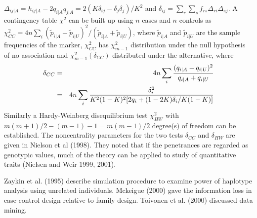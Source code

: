 $\Delta_{ij|A}=h_{ij|A}-2q_{i|A}q_{j|A}=2(K\delta_{ij}-\delta_j\delta_j)/K^2$
and $\delta_{ij}=\sum_r\sum_s f_{rs}\Delta_{ri}\Delta_{sj}$.  A contingency
table $\chi^2$ can be built up using $n$ cases and $n$ controls as
$\chi_{CC}^2=4n\sum_i(\tilde p_{i|A}-\tilde p_{i|U})^2/(\tilde p_{i|A}+\tilde
p_{i|U})$, where $\tilde p_{i|A}$ and $\tilde p_{i|U}$ are the sample
frequencies of the marker, $\chi_{CC}^2$ has $\chi^2_{m-1}$ distribution under
the null hypothesis of no association and $\chi^2_{m-1}(\delta_{CC})$
distributed under the alternative, where
\begin{eqnarray*}
\delta_{CC}&=&4n\sum_i\frac{(q_{i|A}-q_{i|U})^2}{q_{i|A}+q_{i|U}}\cr
            &=&4n\sum_i\frac{\delta_i^2}{K^2(1-K)^2[2q_i+(1-2K)\delta_i/K(1-K)]}
\end{eqnarray*}
Similarly a Hardy-Weinberg disequilibrium test $\chi^2_{HW}$ with
$m(m+1)/2-(m-1)-1=m(m-1)/2$ degree(s) of freedom can be established.  The
noncentrality parameters for the two tests $\delta_{CC}$ and $\delta_{HW}$ are
given in Nielson et al (1998).  They noted that if the penetrances are regarded
as genotypic values, much of the theory can be applied to study of quantitative
traits (Nielsen and Weir 1999, 2001).

Zaykin et al.  (1995) describe simulation procedure to examine power of
haplotype analysis using unrelated individuals.  Mckeigue (2000) gave the
information loss in case-control design relative to family design.  Toivonen et
al.  (2000) discussed data mining.
